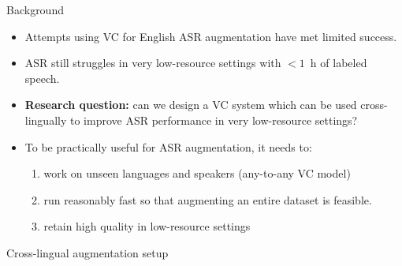\documentclass[final]{beamer}
\newcommand{\nonparallel}[1]{\textcolor{tablue20orange}{#1}}
\newcommand{\zeroshot}[1]{\textcolor{tablue20blue}{#1}}
\newcommand{\realtime}[1]{\textcolor{tablue20red}{#1}}
\newcommand{\highqual}[1]{\textcolor{tablue20green}{#1}}
\newcommand{\mybf}[1]{\textcolor{darkestgray}{\textbf{#1}}}
\begin{document}
\begin{frame}[t]
\begin{columns}[T]
\begin{column}{.33\linewidth}
\begin{minipage}[T]{.97\textwidth}
{\begin{block}{Background}
\begin{itemize}
        \item Attempts using VC for English ASR augmentation have met limited success.
        \item ASR still struggles in very low-resource settings with $<1$~h of labeled speech.
        \item \mybf{Research question:} can we design a VC system which can be used cross-lingually to improve ASR performance in very low-resource settings?
        
        \item To be practically useful for ASR augmentation, it needs to:
        
        \begin{enumerate}
            \item \zeroshot{work on unseen languages and speakers (any-to-any VC model)}
            \item \realtime{run reasonably fast so that augmenting an entire dataset is feasible.}
            \item \nonparallel{retain high quality in low-resource settings} %
        \end{enumerate}
        
    \end{itemize}
\end{block}




\begin{block}{Cross-lingual augmentation setup}
    \vspace{0.2cm}

    \vspace*{-1.3cm}
    \begin{columns}[c]
        

\end{columns}
\end{block}}
\end{minipage}
\end{column}
\end{columns}
\end{frame}
\end{document}

